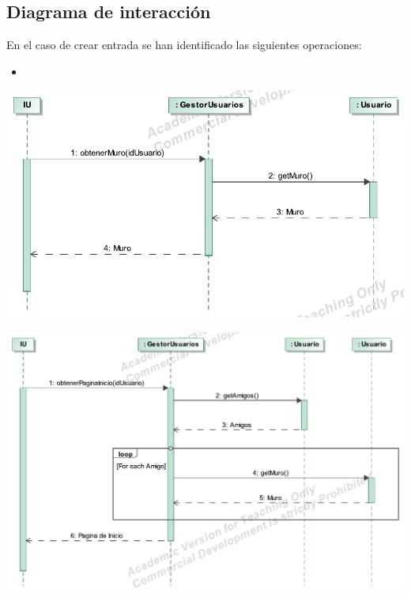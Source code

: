 \documentclass[12pt, a4paper, titlepage]{article}
\begin{document}
\subsection{Diagrama de interacción}

En el caso de {\sc crear entrada} se han identificado las siguientes operaciones:

\begin{itemize}
	\item 
\end{itemize}

\begin{center}
	\includegraphics{Imagenes/OperacionObtenerMuro}
\end{center}

\begin{center}
	\includegraphics{Imagenes/OperacionObtenerPaginaInicio}
\end{center}
\end{document}
